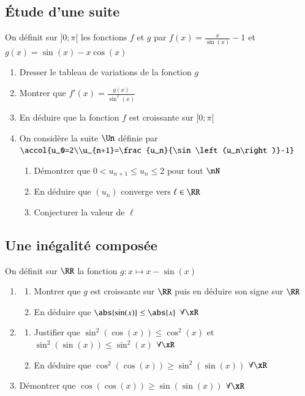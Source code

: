 \documentclass[oneside,12pt]{article}          %
\begin{document}
\subsection{Étude d'une suite}
On définit sur $]0;\pi[$ les fonctions $f$ et $g$ par $f(x)=\frac{x}{\sin(x)}-1$ et $g(x)=\sin(x)-x\cos(x)$
\begin{enumerate}
	\item Dresser le tableau de variations de la fonction $g$
	\item Montrer que $f'(x)=\frac{g(x)}{\sin^2(x)}$
	\item En déduire que la fonction $f$ est croissante sur $[0;\pi[$
	\item On considère la suite $\Un$ définie par $\accol{u_0=2\\u_{n+1}=\frac{u_n}{\sin\left(u_n\right)}-1}$
	\begin{enumerate}
		\item Démontrer que $0< u_{n+1}\leq u_n\leq2$ pour tout $\nN$
		\item En déduire que $(u_n)$ converge vers $\ell\in\RR$
		\item Conjecturer la valeur de $\ell$
	\end{enumerate}
\end{enumerate}



\subsection{Une inégalité composée}
On définit sur $\RR$ la fonction $g:x\mapsto x-\sin(x)$
\begin{enumerate}
	\item \begin{enumerate}
		\item Montrer que $g$ est croissante sur $\RR$ puis en déduire son signe sur $\RR$
		\item En déduire que $\abs{\sin(x)}\leq\abs{x}$ \quad $\forall\xR$
	\end{enumerate}
	\item \begin{enumerate}
		\item Justifier que $\sin^2(\cos(x))\leq\cos^2(x)$ et $\sin^2(\sin(x))\leq\sin^2(x)$ \quad $\forall\xR$
		\item En déduire que $\cos^2(\cos(x)) \geq \sin^2(\sin(x))$ \quad $\forall\xR$
	\end{enumerate}
	\item Démontrer que $\cos(\cos(x)) \geq \sin(\sin(x))$ \quad $\forall\xR$
\end{enumerate}
\end{document}
